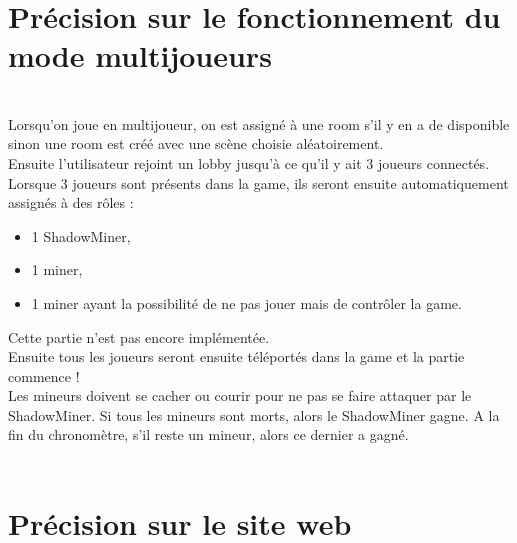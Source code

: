 \documentclass[titlepage, 13px, a4paper]{report}
\begin{document}
\section{Précision sur le fonctionnement du mode multijoueurs}
\paragraph{} \hspace{0pt} \\
Lorsqu’on joue en multijoueur, on est assigné à une room s’il y en a de disponible sinon une room est créé avec une scène choisie aléatoirement. \\

Ensuite l’utilisateur rejoint un lobby jusqu’à ce qu’il y ait 3 joueurs connectés. \\

Lorsque 3 joueurs sont présents dans la game, ils seront ensuite automatiquement assignés à des rôles : \\ 
{\begin{itemize}
	\item 1 ShadowMiner, 
	\item 1 miner,
	\item 1 miner ayant la possibilité de ne pas jouer mais de contrôler la game. \\ 
\end{itemize}} 

Cette partie n’est pas encore implémentée. \\

Ensuite tous les joueurs seront ensuite téléportés dans la game et la partie commence ! \\
Les mineurs doivent se cacher ou courir pour ne pas se faire attaquer par le ShadowMiner.
Si tous les mineurs sont morts, alors le ShadowMiner gagne.
A la fin du chronomètre, s’il reste un mineur, alors ce dernier a gagné. \\ \\


\section{Précision sur le site web}
\paragraph{} \hspace{0pt} \\
\end{document}
